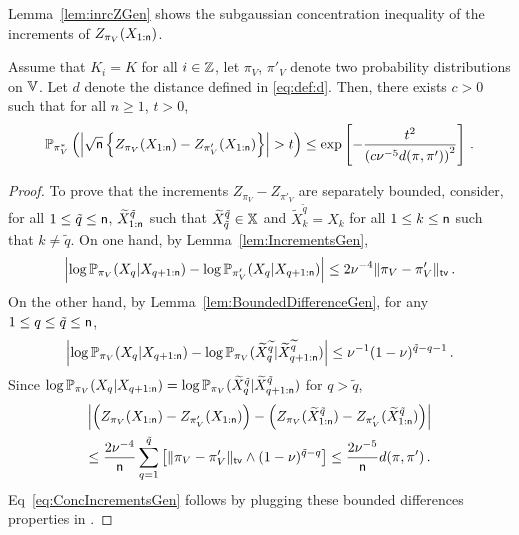 \noindent
Lemma~\ref{lem:inrcZGen} shows the subgaussian concentration inequality of the increments of $Z_{\pi_V}(X_{1:{\mathsf n}})$.
\begin{lemma}
\label{lem:inrcZGen}
Assume that $K_i=K$ for all $i\in\mathbb{Z}$, let $\pi_V$, $\pi'_V$ denote two probability distributions on $\mathbb{V}$. 
Let $d$ denote the distance defined in \eqref{eq:def:d}. 
 Then, there exists $c>0$ such that for all $n\ge 1$, $t>0$,
\begin{equation}\label{eq:ConcIncrementsGen}
 \bP_{\pi_V^*}\pa{\absj{\sqrt{\nobs}\left\{Z_{\pi_V}(X_{1:\nobs}) -Z_{\pi'_V}(X_{1:\nobs})\right\}}>t}\le \exp\cro{-\frac{t^2}{\pa{c\nu^{-5}d(\pi,\pi')}^2}}\eqsp.
\end{equation}
%
\end{lemma}
\begin{proof}
To prove that the increments $Z_{\pi_V}-Z_{\pi'_V}$ are separately bounded, consider, for all $1\le \tilde{q}\le {\mathsf n}$,  $\widetilde{X}^{\tilde{q}}_{1:{\mathsf n}}$ such that $\widetilde{X}_{\tilde{q}}^{\tilde{q}}\in \mathbb{X}$ and $\widetilde{X}_k^{\tilde{q}} = X_k$ for all $1\le k\le {\mathsf n}$ such that $k\neq \tilde{q}$. 
On one hand, by Lemma~\ref{lem:IncrementsGen},
\begin{align*}
\absj{\log \bP_{\pi_V}(X_{q}|X_{q+1:\nobs}) - \log \bP_{\pi'_V}(X_{q}|X_{q+1:\nobs})}\le  2\nu^{-4}\|\pi_V-\pi'_V\|_{\mathsf{tv}}\eqsp.
\end{align*}
On the other hand, by Lemma~\ref{lem:BoundedDifferenceGen}, for any $1\le q\le \tilde{q}\le{\mathsf n}$,
\[
\left|\log \mathbb{P}_{\pi_V}(X_{q}|X_{q+1:{\mathsf n}}) - \log \mathbb{P}_{\pi_V}(\widetilde{X}_{q}^{\widetilde{q}}|\widetilde{X}_{q+1:{\mathsf n}}^{\widetilde{q}})\right| \leq \nu^{-1}(1-\nu)^{\tilde{q}-q-1}\,.
\]
Since $\log \mathbb{P}_{\pi_V}(X_{q}|X_{q+1:{\mathsf n}})=\log \mathbb{P}_{\pi_V}(\widetilde X^{\tilde q}_{q}|\widetilde{X}^{\tilde q}_{q+1:{\mathsf n}})$ for $q>\tilde{q}$,
\begin{multline*}
 \absj{\pa{Z_{\pi_V}(X_{1:\nobs}) -Z_{\pi'_V}(X_{1:\nobs})}-\pa{Z_{\pi_V}(\widetilde{X}^{\tilde{q}}_{1:\nobs})-Z_{\pi'_V}(\widetilde{X}^{\tilde{q}}_{1:\nobs})}}\\
\le\frac{2\nu^{-4}}{\nobs}\sum_{q=1}^{\tilde{q}}\cro{\|\pi_V-\pi'_V\|_{\mathsf{tv}}\wedge(1-\nu)^{\tilde{q}-q}}\le \frac{2\nu^{-5}}{\nobs}d(\pi,\pi')\eqsp.
\end{multline*}
Eq~\eqref{eq:ConcIncrementsGen} follows by plugging these bounded differences properties in \cite[Theorem 0.2]{dedecker:gouezel:2015}.
\end{proof}


